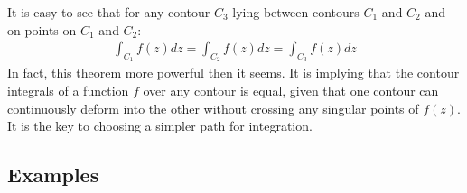 \documentclass[12pt, english]{book}
\begin{document}
	\begin{observation}
		It is easy to see that for any contour \(C_3\) lying between contours \(C_1\) and \(C_2\) and on points on \(C_1\) and \(C_2\):
		\begin{align*}
			\int_{C_1} f(z) dz = \int_{C_2} f(z) dz = \int_{C_3} f(z) dz 
		\end{align*}
		In fact, this theorem more powerful then it seems. It is implying that the contour integrals of a function \(f\) over any contour is equal, given that one contour can continuously deform into the other without crossing any singular points of \(f(z)\). It is the key to choosing a simpler path for integration.
	\end{observation}
	
	\subsection{Examples} 
	
\end{document}
